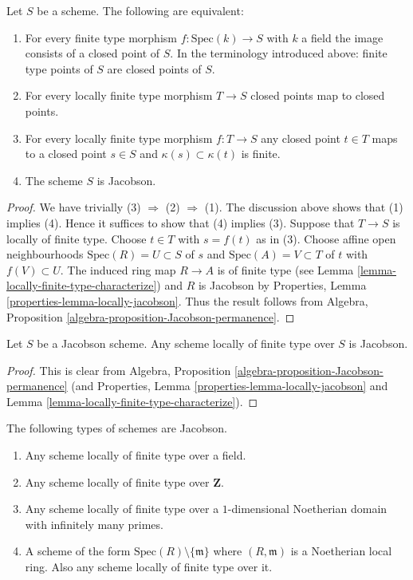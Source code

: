 \begin{lemma}
\label{lemma-jacobson-finite-type-points}
Let $S$ be a scheme.
The following are equivalent:
\begin{enumerate}
\item For every finite type morphism $f : \text{Spec}(k) \to S$
with $k$ a field the image consists of a closed point of $S$.
In the terminology introduced above: finite type points of $S$ are
closed points of $S$.
\item For every locally finite type morphism $T \to S$ closed points map
to closed points.
\item For every locally finite type morphism $f : T \to S$ any closed point
$t \in T$ maps to a closed point $s \in S$ and $\kappa(s) \subset \kappa(t)$
is finite.
\item The scheme $S$ is Jacobson.
\end{enumerate}
\end{lemma}

\begin{proof}
We have trivially (3) $\Rightarrow$ (2) $\Rightarrow$ (1).
The discussion above shows that (1) implies (4).
Hence it suffices to show that (4) implies (3).
Suppose that $T \to S$ is locally of finite type.
Choose $t \in T$ with $s = f(t)$ as in (3).
Choose affine open neighbourhoods $\text{Spec}(R) = U \subset S$ of $s$ and
$\text{Spec}(A) = V \subset T$ of $t$ with $f(V) \subset U$.
The induced ring map $R \to A$ is of finite type
(see Lemma \ref{lemma-locally-finite-type-characterize}) and $R$ is Jacobson
by Properties, Lemma \ref{properties-lemma-locally-jacobson}.
Thus the result follows from
Algebra, Proposition \ref{algebra-proposition-Jacobson-permanence}.
\end{proof}

\begin{lemma}
\label{lemma-Jacobson-universally-Jacobson}
Let $S$ be a Jacobson scheme.
Any scheme locally of finite type over $S$ is Jacobson.
\end{lemma}

\begin{proof}
This is clear from
Algebra, Proposition \ref{algebra-proposition-Jacobson-permanence}
(and Properties, Lemma \ref{properties-lemma-locally-jacobson} and
Lemma \ref{lemma-locally-finite-type-characterize}).
\end{proof}

\begin{lemma}
\label{lemma-ubiquity-Jacobson-schemes}
The following types of schemes are Jacobson.
\begin{enumerate}
\item Any scheme locally of finite type over a field.
\item Any scheme locally of finite type over $\mathbf{Z}$.
\item Any scheme locally of finite type over a $1$-dimensional
Noetherian domain with infinitely many primes.
\item A scheme of the form $\text{Spec}(R) \setminus \{\mathfrak m\}$
where $(R, \mathfrak m)$ is a Noetherian local ring.
Also any scheme locally of finite type over it.
\end{enumerate}
\end{lemma}

